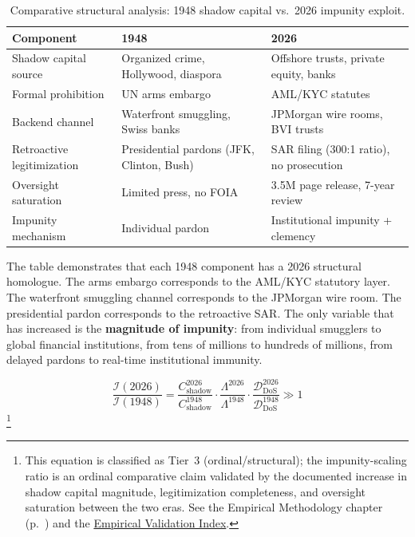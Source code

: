 \begin{table}[htbp]
\centering
\caption{Comparative structural analysis: 1948 shadow capital vs.\ 2026 impunity exploit.}
\label{tab:comparative}
\begin{tabular}{lll}
\toprule
\textbf{Component} & \textbf{1948} & \textbf{2026} \\
\midrule
Shadow capital source & Organized crime, Hollywood, diaspora & Offshore trusts, private equity, banks \\
Formal prohibition & UN arms embargo & AML/KYC statutes \\
Backend channel & Waterfront smuggling, Swiss banks & JPMorgan wire rooms, BVI trusts \\
Retroactive legitimization & Presidential pardons (JFK, Clinton, Bush) & SAR filing (300:1 ratio), no prosecution \\
Oversight saturation & Limited press, no FOIA & 3.5M page release, 7-year review \\
Impunity mechanism & Individual pardon & Institutional impunity + clemency \\
\bottomrule
\end{tabular}
\end{table}

The table demonstrates that each 1948 component has a 2026 structural homologue. The arms embargo corresponds to the AML/KYC statutory layer. The waterfront smuggling channel corresponds to the JPMorgan wire room. The presidential pardon corresponds to the retroactive SAR. The only variable that has increased is the \textbf{magnitude of impunity}: from individual smugglers to global financial institutions, from tens of millions to hundreds of millions, from delayed pardons to real-time institutional immunity.

\begin{equation}\label{eq:gp15-impunity-scaling}
\frac{\mathcal{I}(2026)}{\mathcal{I}(1948)} = \frac{C_{\text{shadow}}^{2026}}{C_{\text{shadow}}^{1948}} \cdot \frac{\Lambda^{2026}}{\Lambda^{1948}} \cdot \frac{\mathcal{D}_{\text{DoS}}^{2026}}{\mathcal{D}_{\text{DoS}}^{1948}} \gg 1
\end{equation}
\footnote{This equation is classified as Tier~3 (ordinal/structural); the impunity-scaling ratio is an ordinal comparative claim validated by the documented increase in shadow capital magnitude, legitimization completeness, and oversight saturation between the two eras. See the Empirical Methodology chapter (p.~\pageref{ch:empirical_methodology}) and the \hyperref[app:empirical_index]{Empirical Validation Index}.}

